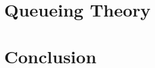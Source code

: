 \documentclass[11pt]{article}
\begin{document}
\section{Queueing Theory}

\section{Conclusion}
\end{document}
